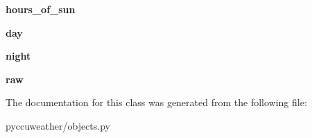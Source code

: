\begin{DoxyCompactItemize}
\item 
\hypertarget{classpyccuweather_1_1objects_1_1_daily_forecast_acfe0799be4578d572e28306c6f4d8fd6}{}{\bfseries hours\+\_\+of\+\_\+sun}\label{classpyccuweather_1_1objects_1_1_daily_forecast_acfe0799be4578d572e28306c6f4d8fd6}

\item 
\hypertarget{classpyccuweather_1_1objects_1_1_daily_forecast_a999e2e41023f59bfb24b6b2c0dfaff8a}{}{\bfseries day}\label{classpyccuweather_1_1objects_1_1_daily_forecast_a999e2e41023f59bfb24b6b2c0dfaff8a}

\item 
\hypertarget{classpyccuweather_1_1objects_1_1_daily_forecast_a61bc6e78cbde2cf71986cca780bccaae}{}{\bfseries night}\label{classpyccuweather_1_1objects_1_1_daily_forecast_a61bc6e78cbde2cf71986cca780bccaae}

\item 
\hypertarget{classpyccuweather_1_1objects_1_1_daily_forecast_afdf04dd2429fd9eb41b5c8b5812582d3}{}{\bfseries raw}\label{classpyccuweather_1_1objects_1_1_daily_forecast_afdf04dd2429fd9eb41b5c8b5812582d3}

\end{DoxyCompactItemize}


The documentation for this class was generated from the following file\+:\begin{DoxyCompactItemize}
\item 
pyccuweather/objects.\+py\end{DoxyCompactItemize}
